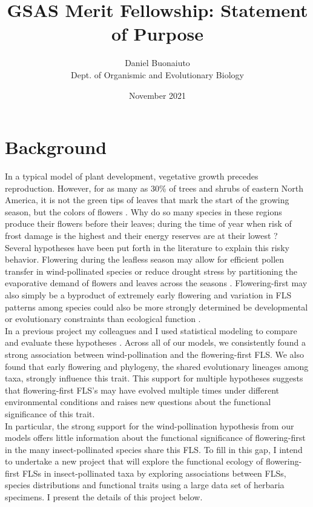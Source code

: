 \documentclass[11pt]{article}
\title{GSAS Merit Fellowship: Statement of Purpose}
\date{November 2021}
\author{Daniel Buonaiuto\\
Dept. of Organismic and Evolutionary Biology}
\begin{document}
\maketitle
\section*{Background}
In a typical model of plant development, vegetative growth precedes reproduction. However, for as many as 30\% of trees and shrubs of eastern North America, it is not the green tips of leaves that mark the start of the growing season, but the colors of flowers \citep{Buonaiuto2020}. Why do so many species in these regions produce their flowers before their leaves; during the time of year when risk of frost damage is the highest \citep{Augspurger:2013aa} and their energy reserves are at their lowest \citep{Primack1987}? \\

Several hypotheses have been put forth in the literature to explain this risky behavior. Flowering during the leafless season may allow for efficient pollen transfer in wind-pollinated species \citep{Rathcke_1985} or reduce drought stress by partitioning the evaporative demand of flowers and leaves across the seasons \citep{Gougherty2018}. Flowering-first may also simply be a byproduct of extremely early flowering \citep{Primack1987} and variation in FLS patterns among species could also be more strongly determined be developmental or evolutionary constraints than ecological function \citep{Gougherty2018,Diggle1995}.\\

In a previous project my colleagues and I used statistical modeling to compare and evaluate these hypotheses \citep{Buonaiuto2020}. Across all of our models, we consistently found a strong association between wind-pollination and the flowering-first FLS. We also found that early flowering and phylogeny, the shared evolutionary lineages among taxa, strongly influence this trait. This support for multiple hypotheses suggests that flowering-first FLS’s may have evolved multiple times under different environmental conditions and raises new questions about the functional significance of this trait.\\

In particular, the strong support for the wind-pollination hypothesis from our models offers little information about the functional significance of flowering-first in the many insect-pollinated species share this FLS. To fill in this gap, I intend to undertake a new project that will explore the functional ecology of flowering-first FLSs in insect-pollinated taxa by exploring associations between FLSs, species distributions and functional traits using a large data set of herbaria specimens. I present the details of this project below.
\end{document}

